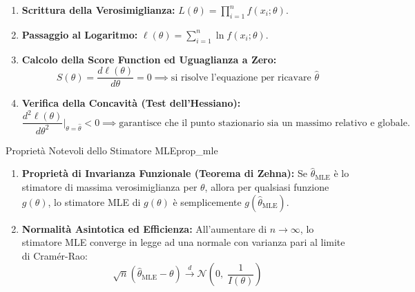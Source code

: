 \begin{metodo}
\begin{enumerate}
    \item \textbf{Scrittura della Verosimiglianza:} $L(\theta) = \prod_{i=1}^n f(x_i; \theta)$.
    \item \textbf{Passaggio al Logaritmo:} $\ell(\theta) = \sum_{i=1}^n \ln f(x_i; \theta)$.
    \item \textbf{Calcolo della Score Function ed Uguaglianza a Zero:}
    \begin{equation}
        S(\theta) = \frac{d\ell(\theta)}{d\theta} = 0 \implies \text{si risolve l'equazione per ricavare } \widehat{\theta}
    \end{equation}
    \item \textbf{Verifica della Concavità (Test dell'Hessiano):}
    \begin{equation}
        \frac{d^2\ell(\theta)}{d\theta^2} \Bigg|_{\theta = \widehat{\theta}} < 0 \implies \text{garantisce che il punto stazionario sia un massimo relativo e globale.}
    \end{equation}
\end{enumerate}
\end{metodo}

\begin{teorema}{Proprietà Notevoli dello Stimatore MLE}{prop_mle}
\begin{enumerate}
    \item \textbf{Proprietà di Invarianza Funzionale (Teorema di Zehna):} Se $\widehat{\theta}_{\text{MLE}}$ è lo stimatore di massima verosimiglianza per $\theta$, allora per qualsiasi funzione $g(\theta)$, lo stimatore MLE di $g(\theta)$ è semplicemente $g(\widehat{\theta}_{\text{MLE}})$.
    \item \textbf{Normalità Asintotica ed Efficienza:} All'aumentare di $n \to \infty$, lo stimatore MLE converge in legge ad una normale con varianza pari al limite di Cramér-Rao:
    \begin{equation}
        \sqrt{n}(\widehat{\theta}_{\text{MLE}} - \theta) \xrightarrow{d} \mathcal{N}\left(0, \; \frac{1}{I(\theta)}\right)
    \end{equation}
\end{enumerate}
\end{teorema}

